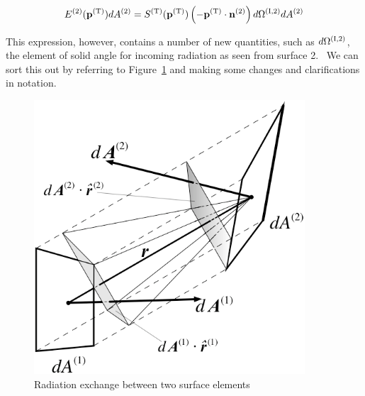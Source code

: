 \begin{equation}
{E^{{\rm{(2)}}}}({{\bf{p}}^{{\rm{(T)}}}})d{A^{{\rm{(2)}}}} = {S^{{\rm{(T)}}}}({{\bf{p}}^{{\rm{(T)}}}})\left( { - {{\bf{p}}^{{\rm{(T)}}}}\cdot {{\bf{n}}^{{\rm{(2)}}}}} \right)d{\Omega ^{{\rm{(I,2)}}}}d{A^{{\rm{(2)}}}}
\label{eq:E2pTdA2Equation}
\end{equation}

This expression, however, contains a number of new quantities, such as \(d{\Omega ^{{\rm{(I,2)}}}}\), the element of solid angle for incoming radiation as seen from surface 2.~ We can sort this out by referring to Figure~\ref{fig:radiation-exchange-between-two-surface} and making some changes and clarifications in notation.

\begin{figure}[hbtp] %
\centering
\includegraphics[width=0.9\textwidth, height=0.9\textheight, keepaspectratio=true]{media/image1275.png}
\caption{Radiation exchange between two surface elements \protect \label{fig:radiation-exchange-between-two-surface}}
\end{figure}

